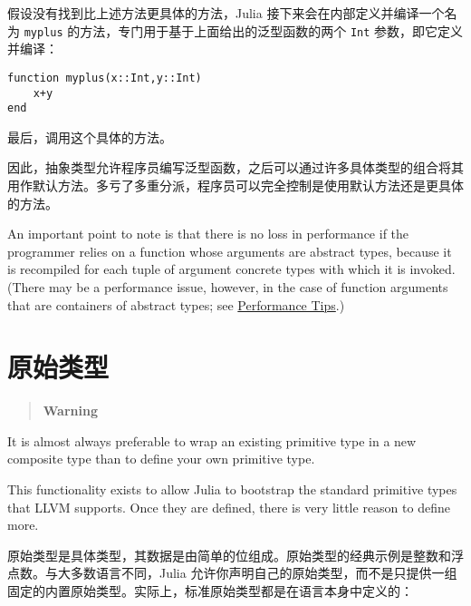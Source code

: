 假设没有找到比上述方法更具体的方法，Julia 接下来会在内部定义并编译一个名为 \texttt{myplus} 的方法，专门用于基于上面给出的泛型函数的两个 \texttt{Int} 参数，即它定义并编译：




\begin{verbatim}
function myplus(x::Int,y::Int)
    x+y
end
\end{verbatim}



最后，调用这个具体的方法。



因此，抽象类型允许程序员编写泛型函数，之后可以通过许多具体类型的组合将其用作默认方法。多亏了多重分派，程序员可以完全控制是使用默认方法还是更具体的方法。



An important point to note is that there is no loss in performance if the programmer relies on a function whose arguments are abstract types, because it is recompiled for each tuple of argument concrete types with which it is invoked. (There may be a performance issue, however, in the case of function arguments that are containers of abstract types; see \hyperlink{16419743784254835624}{Performance Tips}.)



\hypertarget{7048513132833584013}{}


\section{原始类型}



\begin{quote}
\textbf{Warning}

\end{quote}


It is almost always preferable to wrap an existing primitive type in a new   composite type than to define your own primitive type.



This functionality exists to allow Julia to bootstrap the standard primitive   types that LLVM supports. Once they are defined, there is very little reason   to define more.



原始类型是具体类型，其数据是由简单的位组成。原始类型的经典示例是整数和浮点数。与大多数语言不同，Julia 允许你声明自己的原始类型，而不是只提供一组固定的内置原始类型。实际上，标准原始类型都是在语言本身中定义的：




